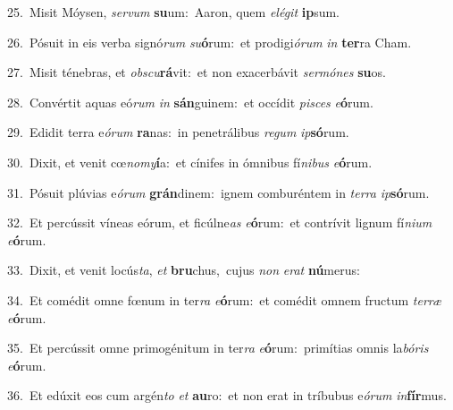 {\numbfont\textcolor{\numbcolor}{25.}}~Misit Móysen, \textit{ser}\-\textit{vum} \textbf{su}\-um:~\star Aaron, quem \textit{e}\-\textit{lé}\textit{git} \textbf{ip}\-sum.\par
{\numbfont\textcolor{\numbcolor}{26.}}~Pósuit in eis verba signó\textit{rum} \textit{su}\-\textbf{ó}rum:~\star et prodigi\-\textit{ó}\-\textit{rum} \textit{in} \textbf{ter}\-ra Cham.\par
{\numbfont\textcolor{\numbcolor}{27.}}~Misit ténebras, et \textit{obs}\-\textit{cu}\textbf{rá}vit:~\star et non exacerbávit \textit{ser}\-\textit{mó}\textit{nes} \textbf{su}\-os.\par
{\numbfont\textcolor{\numbcolor}{28.}}~Convértit aquas eó\textit{rum} \textit{in} \textbf{sán}\-guinem:~\star et occídit \textit{pi}\-\textit{sces} \textit{e}\-\textbf{ó}rum.\par
{\numbfont\textcolor{\numbcolor}{29.}}~Edidit terra e\-\textit{ó}\-\textit{rum} \textbf{ra}\-nas:~\star in penetrálibus \textit{re}\-\textit{gum} \textit{ip}\-\textbf{só}rum.\par
{\numbfont\textcolor{\numbcolor}{30.}}~Dixit, et venit cœ\-\textit{no}\-\textit{my}\textbf{í}a:~\star et cínifes in ómnibus fí\-\textit{ni}\-\textit{bus} \textit{e}\-\textbf{ó}rum.\par
{\numbfont\textcolor{\numbcolor}{31.}}~Pósuit plúvias e\-\textit{ó}\-\textit{rum} \textbf{grán}\-dinem:~\star ignem comburéntem in \textit{ter}\-\textit{ra} \textit{ip}\-\textbf{só}rum.\par
{\numbfont\textcolor{\numbcolor}{32.}}~Et percússit víneas eórum, et ficúlne\textit{as} \textit{e}\-\textbf{ó}rum:~\star et contrívit lignum fí\-\textit{ni}\-\textit{um} \textit{e}\-\textbf{ó}rum.\par
{\numbfont\textcolor{\numbcolor}{33.}}~Dixit, et venit locús\-\textit{ta}\-, \textit{et} \textbf{bru}\-chus,~\star cujus \textit{non} \textit{e}\-\textit{rat} \textbf{nú}\-merus:\par
{\numbfont\textcolor{\numbcolor}{34.}}~Et comédit omne fœnum in ter\textit{ra} \textit{e}\-\textbf{ó}rum:~\star et comédit omnem fructum \textit{ter}\-\textit{ræ} \textit{e}\-\textbf{ó}rum.\par
{\numbfont\textcolor{\numbcolor}{35.}}~Et percússit omne primogénitum in ter\textit{ra} \textit{e}\-\textbf{ó}rum:~\star primítias omnis la\-\textit{bó}\-\textit{ris} \textit{e}\-\textbf{ó}rum.\par
{\numbfont\textcolor{\numbcolor}{36.}}~Et edúxit eos cum argén\textit{to} \textit{et} \textbf{au}\-ro:~\star et non erat in tríbubus e\-\textit{ó}\-\textit{rum} \textit{in}\-\textbf{fír}mus.\par
